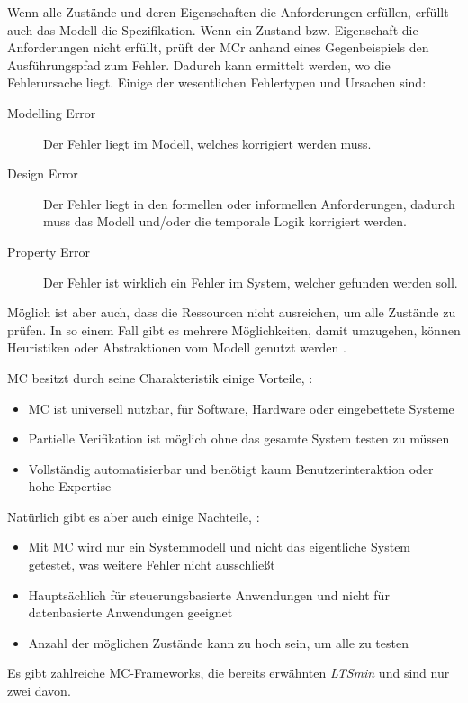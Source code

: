 Wenn alle Zustände und deren Eigenschaften die Anforderungen erfüllen, erfüllt auch das Modell die Spezifikation. Wenn ein Zustand bzw. Eigenschaft die Anforderungen nicht erfüllt, prüft der \ac{MCr} anhand eines Gegenbeispiels den Ausführungspfad zum Fehler. Dadurch kann ermittelt werden, wo die Fehlerursache liegt. Einige der wesentlichen Fehlertypen und Ursachen sind:

\begin{description}
	\item[Modelling Error] Der Fehler liegt im Modell, welches korrigiert werden muss.
	\item[Design Error] Der Fehler liegt in den formellen oder informellen Anforderungen, dadurch muss das Modell und/oder die temporale Logik korrigiert werden.
	\item[Property Error] Der Fehler ist wirklich ein Fehler im System, welcher gefunden werden soll.
\end{description}

Möglich ist aber auch, dass die Ressourcen nicht ausreichen, um alle Zustände zu prüfen. In so einem Fall gibt es mehrere Möglichkeiten, damit umzugehen, \zB können Heuristiken oder Abstraktionen vom Modell genutzt werden \cite{Baier2008,Eberhardinger2016}.

\ac{MC} besitzt durch seine Charakteristik einige Vorteile, \uA \cite{Baier2008}:
\begin{itemize}[noitemsep]
	\item \ac{MC} ist universell nutzbar, \zB für Software, Hardware oder eingebettete Systeme
	\item Partielle Verifikation ist möglich ohne das gesamte System testen zu müssen
	\item Vollständig automatisierbar und benötigt kaum Benutzerinteraktion oder hohe Expertise
\end{itemize}

Natürlich gibt es aber auch einige Nachteile, \uA \cite{Baier2008}:
\begin{itemize}[noitemsep]
	\item Mit \ac{MC} wird nur ein Systemmodell und nicht das eigentliche System getestet, was weitere Fehler nicht ausschließt
	\item Hauptsächlich für steuerungsbasierte Anwendungen und nicht für datenbasierte Anwendungen geeignet
	\item Anzahl der möglichen Zustände kann zu hoch sein, um alle zu testen
\end{itemize}

Es gibt zahlreiche \ac{MC}-Frameworks, die bereits erwähnten \emph{LTSmin} und \emph{\sS} sind nur zwei davon.